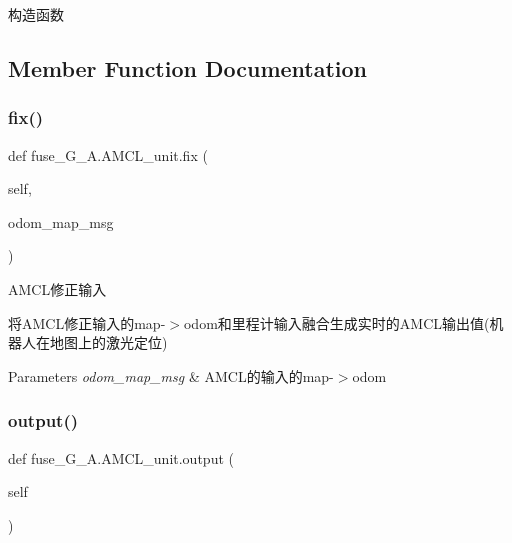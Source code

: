构造函数 



\subsection{Member Function Documentation}
\mbox{\label{classfuse___g___a_1_1_a_m_c_l__unit_a0e727db571dee1250185e4c00e239030}} 
\subsubsection{\texorpdfstring{fix()}{fix()}}
{\footnotesize\ttfamily def fuse\+\_\+\+G\+\_\+\+A.\+A\+M\+C\+L\+\_\+unit.\+fix (\begin{DoxyParamCaption}\item[{}]{self,  }\item[{}]{odom\+\_\+map\+\_\+msg }\end{DoxyParamCaption})}



A\+M\+C\+L修正输入 

将\+A\+M\+C\+L修正输入的map-\/$>$odom和里程计输入融合生成实时的\+A\+M\+C\+L输出值(机器人在地图上的激光定位)


\begin{DoxyParams}{Parameters}
{\em odom\+\_\+map\+\_\+msg} & A\+M\+C\+L的输入的map-\/$>$odom \\
\hline
\end{DoxyParams}
\mbox{\label{classfuse___g___a_1_1_a_m_c_l__unit_a6f69c46a7f160ce28b52991b28fad400}} 
\subsubsection{\texorpdfstring{output()}{output()}}
{\footnotesize\ttfamily def fuse\+\_\+\+G\+\_\+\+A.\+A\+M\+C\+L\+\_\+unit.\+output (\begin{DoxyParamCaption}\item[{}]{self }\end{DoxyParamCaption})}



